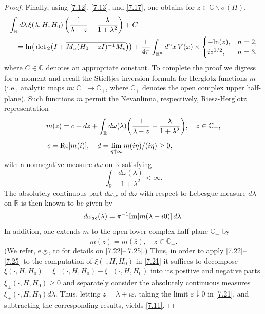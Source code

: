 \documentclass[reqno,10pt, centertags]{amsart}
\newcommand{\bbR}{{\mathbb{R}}}
\newcommand{\bbC}{{\mathbb{C}}}
\newcommand{\lb}{\label}
\newcommand{\ol}{\overline}
\newcommand{\eps}{\varepsilon}
\newcommand{\la}{\lambda}
\newcommand{\si}{\sigma}
\renewcommand{\Re}{\text{\rm Re}}
\renewcommand{\Im}{\text{\rm Im}}
\renewcommand{\ln}{\text{\rm ln}}
\numberwithin{equation}{section}
\theoremstyle{definition}
\begin{document}
\begin{proof}
Finally, using \eqref{7.12}, \eqref{7.13}, and \eqref{7.17},
one obtains for $z\in\bbC\backslash\si(H)$,
\begin{align}
\begin{split}
& \int_\bbR d\la\, \xi(\la,H,H_0)
\left(\frac{1}{\la-z}-\frac{\la}{1+\la^2}\right) + C    \\
& \quad =\ln\big(\det{}_2\big(I+\ol{M_u(H_0-zI)^{-1}M_v}\big)\big)
+\frac{1}{4\pi}\int_{\bbR^n} d^nx\,V(x)
\times \begin{cases} -\ln(z), & n=2, \\
i z^{1/2}, & n=3,
\end{cases}  \lb{7.21}
\end{split}
\end{align}
where $C\in\bbC$ denotes an appropriate constant. To complete the proof
we digress for a moment and recall the Stieltjes inversion formula for
Herglotz functions $m$ (i.e., analytic maps $m\colon \bbC_+\to\bbC_+$,
where $\bbC_+$ denotes the open complex upper half-plane). Such functions
$m$ permit the Nevanlinna, respectively, Riesz-Herglotz
representation
\begin{align}
\begin{split}
&m(z)=c+dz+\int_{{\mathbb{R}}}
d\omega (\lambda) \bigg(\frac{1}{\lambda -z}-\frac{\lambda}
{1+\lambda^2}\bigg), \quad z\in\bbC_+, \lb{7.22} \\[2mm]
& \, c=\Re[m(i)],\quad d=\lim_{\eta \uparrow
\infty}m(i\eta )/(i\eta ) \geq 0,
\end{split}
\end{align}
with a nonnegative measure $d\omega$ on ${\mathbb{R}}$ satisfying
\begin{equation} \lb{7.23}
\int_{{\mathbb{R}}} \frac{d\omega (\lambda )}{1+\lambda^2}<\infty.
\end{equation}
The absolutely continuous part $d\omega_{ac}$ of
$d\omega$ with respect to Lebesgue measure $d\lambda$ on
${\mathbb{R}}$ is then known to be given by
\begin{equation}\lb{7.24}
d\omega_{ac}(\lambda)=\pi^{-1}\Im[m(\lambda+i0)]\,d\lambda.
\end{equation}
In addition, one extends $m$ to the open lower complex half-plane $\bbC_-$
by
\begin{equation}
m(z)=\ol{m(\ol z)}, \quad z\in\bbC_-.   \lb{7.25}
\end{equation}
(We refer, e.g., to \cite[Sect.\ 69]{AG81} for details on
\eqref{7.22}--\eqref{7.25}.) Thus, in order to apply
\eqref{7.22}--\eqref{7.25} to the computation of
$\xi(\cdot,H,H_0)$ in \eqref{7.21} it suffices to decompose
$\xi(\cdot,H,H_0)=\xi_+(\cdot,H,H_0)-\xi_-(\cdot,H,H_0)$ into its
positive and negative parts $\xi_{\pm}(\cdot,H,H_0)\geq 0$ and
separately consider the absolutely continuous measures
$\xi_{\pm}(\cdot,H,H_0) d\lambda$.  Thus, letting
$z=\la\pm i\eps$, taking the limit $\eps\downarrow 0$ in \eqref{7.21},
and subtracting the corresponding results, yields \eqref{7.11}.
\end{proof}
\end{document}
